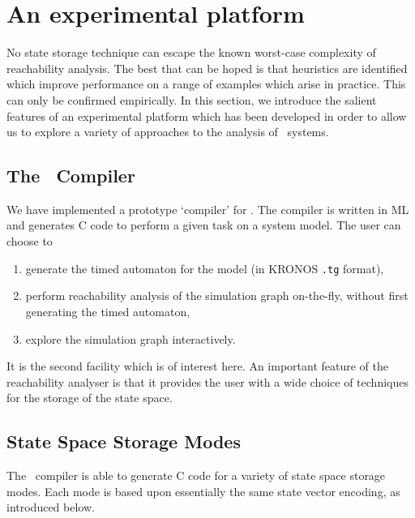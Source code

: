 \section{An experimental platform\label{sec:sgplatform}}
No state storage technique can escape the known worst-case complexity
of reachability analysis. The best that can be hoped is that
heuristics are identified which improve performance on a range of
examples which arise in practice. This can only be confirmed
empirically. In this section, we introduce the salient features of an
experimental platform which has been developed in order to allow us to
explore a variety of approaches to the analysis of \bcandle\ systems.
 
\subsection{The \bcandle\ Compiler}
We have implemented a prototype `compiler' for \bcandle. The compiler
is written in ML and generates C code to perform a given task on a
system model. The user can choose to
\begin{enumerate}
\item generate the timed automaton for the model (in KRONOS {\tt .tg} format), 
\item perform reachability analysis of the simulation graph on-the-fly, 
without first generating the timed automaton,
\item explore the simulation graph interactively.
\end{enumerate} 
It is the second facility which is of interest here. An important
feature of the reachability analyser is that it provides the user with
a wide choice of techniques for the storage of the state space. 

\subsection{State Space Storage Modes}
The \bcandle\ compiler is able to generate C code for
a variety of state space storage modes. Each mode is based upon essentially
the same state vector encoding, as introduced below.
